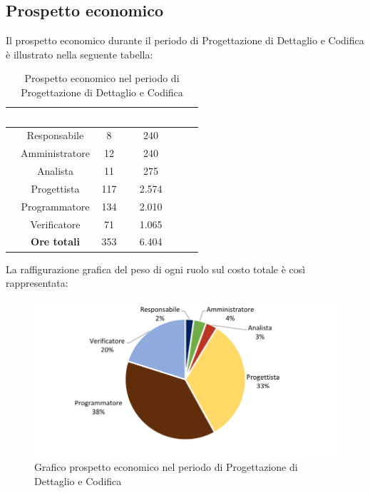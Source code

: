 \subsection{Prospetto economico}
Il prospetto economico durante il periodo di Progettazione di Dettaglio e Codifica è illustrato nella seguente tabella:

\begin{table}[ht]
	\begin{center}
		\begin{tabular}{cccccc}
			\rowcolor{coolblack}
			\hline
			&\textcolor{white}{Ruolo}&	\textcolor{white}{Ore} &\textcolor{white}{Costo(\euro)} \\
			\hline
			&Responsabile           &8&240\\
			&Amministratore        & 12& 240 \\
			&Analista                   & 11& 275 \\
			&Progettista              &  117& 2.574\\
			&Programmatore       & 134& 2.010 \\
			&Verificatore             & 71& 1.065 \\
			\hline
			&\textbf{Ore totali}    &353&6.404\\
		\end{tabular}
		\caption{Prospetto economico nel periodo di Progettazione di Dettaglio e Codifica}
	\end{center}
\end{table}

La raffigurazione grafica del peso di ogni ruolo sul costo totale è così rappresentata:

\begin{figure}[!ht]
	\begin{center}
		\includegraphics{images/grafoProgettazioneDettaglioCodificaEuro.png}
		\caption{Grafico prospetto economico nel periodo di Progettazione di Dettaglio e Codifica}
	\end{center}
\end{figure}

